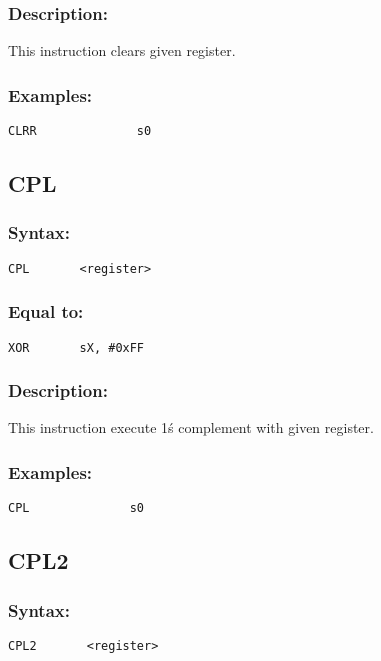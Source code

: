         \subsubsection{Description:}
            This instruction clears given register.

        \subsubsection{Examples:}
            {
                \usecodefont
                \verb'CLRR              s0'\\
            }

    \subsection{CPL}
        \subsubsection{Syntax:}
            {
                \usecodefont
                \verb'CPL       <register>'
            }

        \subsubsection{Equal to:}
            {
                \usecodefont
                \verb'XOR       sX, #0xFF'
            }

        \subsubsection{Description:}
            This instruction execute 1\'s complement with given register.

        \subsubsection{Examples:}
            {
                \usecodefont
                \verb'CPL              s0'\\
            }

    \subsection{CPL2}
        \subsubsection{Syntax:}
            {
                \usecodefont
                \verb'CPL2       <register>'
            }

